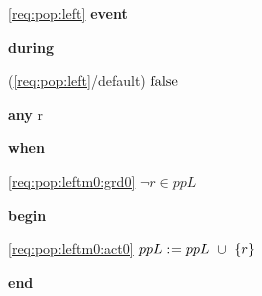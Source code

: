 \noindent \ref{req:pop:left}  \textbf{event}
\begin{block}
  \item   \textbf{during}
  \begin{block}
  \item[ (\ref{req:pop:left}/default) ]{$\text{false} $} %
  \end{block}
  \item   \textbf{any} r
  \item   \textbf{when}
  \begin{block}
  \item[ \eqref{req:pop:leftm0:grd0} ]{$\neg r \in ppL $} %
  \end{block}
  \item   \textbf{begin}
  \begin{block}
  \item[ \eqref{req:pop:leftm0:act0} ]{$ppL \mathrel{:\mkern1mu=} ppL \; \mathbin{\mkern1mu\cup\mkern1mu} \; \{r\} $} %
  \end{block}
  \item   \textbf{end} \\
\end{block}
